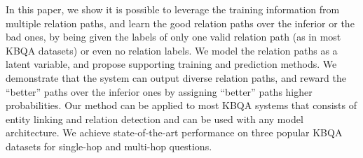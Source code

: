 
In this paper, we show it is possible to leverage the training information from multiple relation paths, and learn the good relation paths over the inferior or the bad ones, by being given the labels of only one valid relation path (as in most KBQA datasets) or even no relation labels. We model the relation paths as a latent variable, and propose supporting training and prediction methods. We demonstrate that the system can output diverse relation paths, and reward the ``better'' paths over the inferior ones by assigning ``better'' paths higher probabilities. Our method can be applied to most KBQA systems that consists of entity linking and relation detection and can be used with any model architecture. We achieve state-of-the-art performance on three popular KBQA datasets for single-hop and multi-hop questions.%
